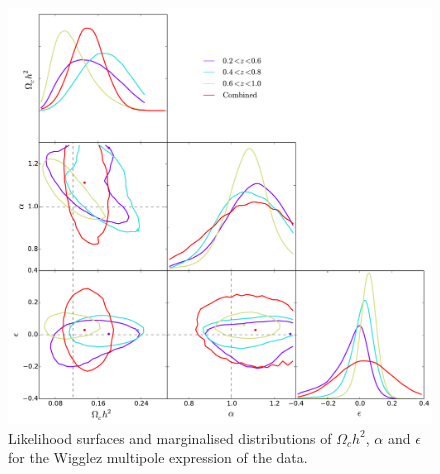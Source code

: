 \documentclass[titlesmallcaps, examinerscopy, copyrightpage]{uqthesis}
\begin{document}
\begin{figure}[h!]
  \begin{center}
    \includegraphics[width=\textwidth]{images/corCombinedMP.pdf}
  \end{center}
  \caption{Likelihood surfaces and marginalised distributions of $\Omega_ch^2$, $\alpha$ and $\epsilon$ for the Wigglez multipole expression of the data. }
  \label{fig:wigglezMPResults}
\end{figure}
\end{document}
